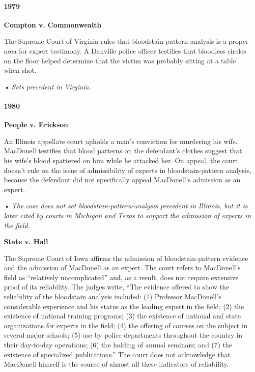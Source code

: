 \hypertarget{1979}{%
\paragraph{1979}\label{1979}}

\textbf{Compton v. Commonwealth}

The Supreme Court of Virginia rules that bloodstain-pattern analysis is
a proper area for expert testimony. A Danville police officer testifies
that bloodless circles on the floor helped determine that the victim was
probably sitting at a table when shot.

\emph{• Sets precedent in Virginia.}

\hypertarget{1980}{%
\paragraph{1980}\label{1980}}

\textbf{People v. Erickson}

An Illinois appellate court upholds a man's conviction for murdering his
wife. MacDonell testifies that blood patterns on the defendant's clothes
suggest that his wife's blood spattered on him while he attacked her. On
appeal, the court doesn't rule on the issue of admissibility of experts
in bloodstain-pattern analysis, because the defendant did not
specifically appeal MacDonell's admission as an expert.

\emph{• The case does not set bloodstain-pattern-analysis precedent in
Illinois, but it is later cited by courts in Michigan and Texas to
support the admission of experts in the field.}

\textbf{State v. Hall}

The Supreme Court of Iowa affirms the admission of bloodstain-pattern
evidence and the admission of MacDonell as an expert. The court refers
to MacDonell's field as ``relatively uncomplicated'' and, as a result,
does not require extensive proof of its reliability. The judges write,
``The evidence offered to show the reliability of the bloodstain
analysis included: (1) Professor MacDonell's considerable experience and
his status as the leading expert in the field; (2) the existence of
national training programs; (3) the existence of national and state
organizations for experts in the field; (4) the offering of courses on
the subject in several major schools; (5) use by police departments
throughout the country in their day-to-day operations; (6) the holding
of annual seminars; and (7) the existence of specialized publications.''
The court does not acknowledge that MacDonell himself is the source of
almost all these indicators of reliability.

